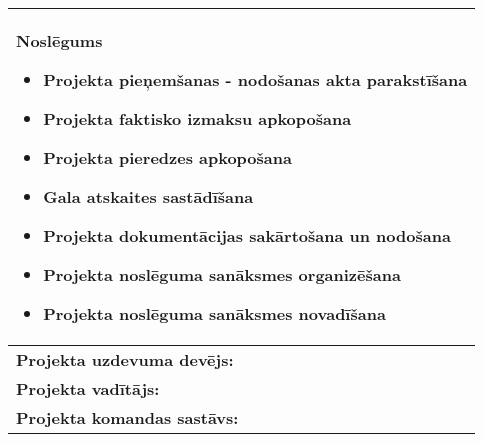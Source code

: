 \begin{longtable}{|p{}|}
      \hline
        \textbf{Noslēgums}
        \begin{itemize}
          \item Projekta pieņemšanas - nodošanas akta parakstīšana
          \item Projekta faktisko izmaksu apkopošana
          \item Projekta pieredzes apkopošana
          \item Gala atskaites sastādīšana
          \item Projekta dokumentācijas sakārtošana un nodošana
          \item Projekta noslēguma sanāksmes organizēšana
          \item Projekta noslēguma sanāksmes novadīšana
        \end{itemize}\\
      \hline
        \textbf{Projekta uzdevuma devējs:}\\
      \hline
        \textbf{Projekta vadītājs:}\\
      \hline
        \textbf{Projekta komandas sastāvs:}\\
      \hline
    \end{longtable}
  \clearpage